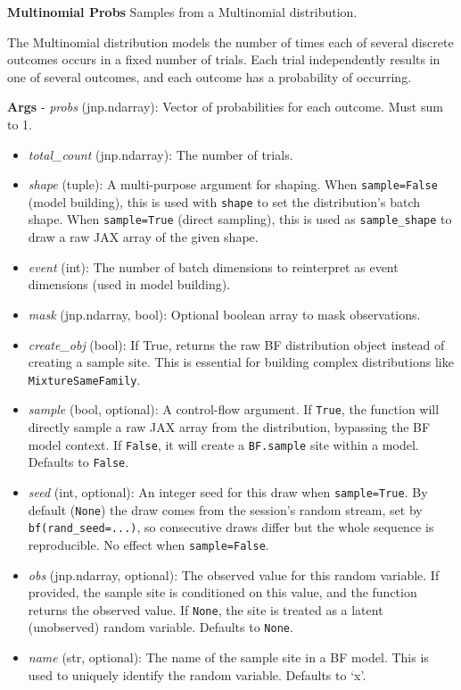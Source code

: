 \documentclass[
  letterpaper,
  DIV=11,
  numbers=noendperiod]{scrartcl}
\begin{document}
\textbf{Multinomial Probs} Samples from a Multinomial distribution.

The Multinomial distribution models the number of times each of several
discrete outcomes occurs in a fixed number of trials. Each trial
independently results in one of several outcomes, and each outcome has a
probability of occurring.

\textbf{Args} - \emph{probs} (jnp.ndarray): Vector of probabilities for
each outcome. Must sum to 1.

\begin{itemize}
\item
  \emph{total\_count} (jnp.ndarray): The number of trials.
\item
  \emph{shape} (tuple): A multi-purpose argument for shaping. When
  \texttt{sample=False} (model building), this is used with
  \texttt{shape} to set the distribution's batch shape. When
  \texttt{sample=True} (direct sampling), this is used as
  \texttt{sample\_shape} to draw a raw JAX array of the given shape.
\item
  \emph{event} (int): The number of batch dimensions to reinterpret as
  event dimensions (used in model building).
\item
  \emph{mask} (jnp.ndarray, bool): Optional boolean array to mask
  observations.
\item
  \emph{create\_obj} (bool): If True, returns the raw BF distribution
  object instead of creating a sample site. This is essential for
  building complex distributions like \texttt{MixtureSameFamily}.
\item
  \emph{sample} (bool, optional): A control-flow argument. If
  \texttt{True}, the function will directly sample a raw JAX array from
  the distribution, bypassing the BF model context. If \texttt{False},
  it will create a \texttt{BF.sample} site within a model. Defaults to
  \texttt{False}.
\item
  \emph{seed} (int, optional): An integer seed for this draw when
  \texttt{sample=True}. By default (\texttt{None}) the draw comes from
  the session's random stream, set by \texttt{bf(rand\_seed=...)}, so
  consecutive draws differ but the whole sequence is reproducible. No
  effect when \texttt{sample=False}.
\item
  \emph{obs} (jnp.ndarray, optional): The observed value for this random
  variable. If provided, the sample site is conditioned on this value,
  and the function returns the observed value. If \texttt{None}, the
  site is treated as a latent (unobserved) random variable. Defaults to
  \texttt{None}.
\item
  \emph{name} (str, optional): The name of the sample site in a BF
  model. This is used to uniquely identify the random variable. Defaults
  to `x'.
\end{itemize}
\end{document}
